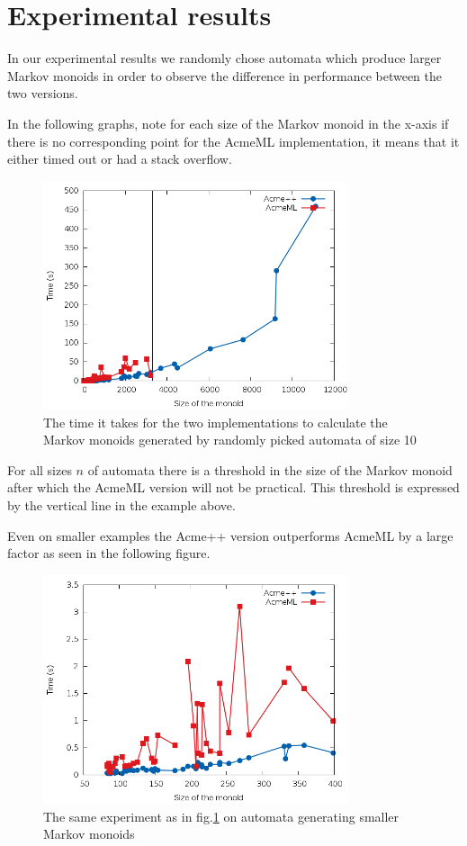 \section{Experimental results}
In our experimental results we randomly chose automata which produce
larger Markov monoids in order to observe the difference in
performance between the two versions.

In the following graphs, note for each size of the Markov monoid in
the x-axis if there is no corresponding point for the AcmeML
implementation, it means that it either timed out or had a stack
overflow.
\begin{figure}
  \label{fig1}
  \begin{center}
    \includegraphics[width=0.8\textwidth]{graph/lines}
    \caption{The time it takes for the two implementations to
      calculate the Markov monoids generated by randomly picked
      automata of size 10}
  \end{center}  
\end{figure}

For all sizes $n$ of automata there is a threshold in the size of the
Markov monoid after which the AcmeML version will not be
practical. This threshold is expressed by the vertical line in the
example above. 

Even on smaller examples the Acme++ version outperforms AcmeML by a
large factor as seen in the following figure.

\begin{figure}
  \label{fig2}
  \begin{center}
    \includegraphics[width=0.8\textwidth]{graph/zoomlines}
    \caption{The same experiment as in fig.\ref{fig1} on automata
      generating smaller Markov monoids}
  \end{center}  
\end{figure}
